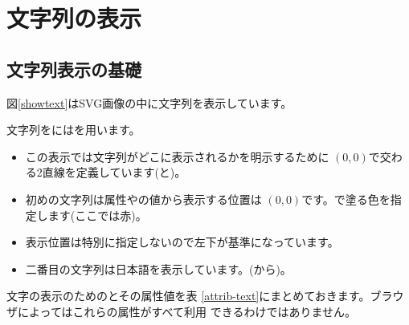 \chapter{文字列の表示}\label{ShowText}
\section{文字列表示の基礎}
図\ref{showtext}はSVG画像の中に文字列を表示しています。

文字列をにはを用います。
{}
\begin{itemize}
 \item この表示では文字列がどこに表示されるかを明示するために
       $(0,0)$で交わる2直線を定義しています(と)。
 \item 初めの文字列は属性やの値から表示する位置は
       $(0,0)$です。で塗る色を指定します(ここでは赤)。
 \item 表示位置は特別に指定しないので左下が基準になっています。
 \item 二番目の文字列は日本語を表示しています。(から)。
\end{itemize}
文字の表示のためのとその属性値を表
\ref{attrib-text}にまとめておきます。ブラウザによってはこれらの属性がすべて利用
できるわけではありません。

